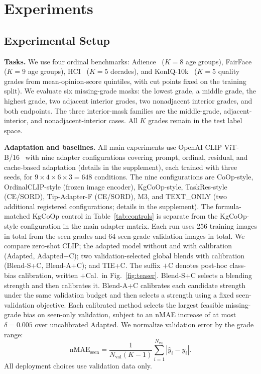 \section{Experiments}
\label{sec:experiments}

\subsection{Experimental Setup}
\label{sec:exp_setup}

\noindent\textbf{Tasks.}
We use four ordinal benchmarks: Adience~\cite{eidinger2014age} ($K{=}8$ age groups), FairFace~\cite{karkkainen2021fairface} ($K{=}9$ age groups), HCI~\cite{palermo2012dating} ($K{=}5$ decades), and KonIQ-10k~\cite{hosu2020koniq} ($K{=}5$ quality grades from mean-opinion-score quintiles, with cut points fixed on the training split).
We evaluate six missing-grade masks: the lowest grade, a middle grade, the highest grade, two adjacent interior grades, two nonadjacent interior grades, and both endpoints.
The three interior-mask families are the middle-grade, adjacent-interior, and nonadjacent-interior cases.
All $K$ grades remain in the test label space.

\noindent\textbf{Adaptation and baselines.}
All main experiments use OpenAI CLIP ViT-B/16~\cite{radford2021clip} with nine adapter configurations covering prompt, ordinal, residual, and cache-based adaptation (details in the supplement), each trained with three seeds, for $9\times4\times6\times3=648$ conditions.
The nine configurations are CoOp-style, OrdinalCLIP-style (frozen image encoder), KgCoOp-style, TaskRes-style (CE/SORD), Tip-Adapter-F (CE/SORD), M3, and TEXT\_ONLY (two additional registered configurations; details in the supplement).
The formula-matched KgCoOp control in Table~\ref{tab:controls} is separate from the KgCoOp-style configuration in the main adapter matrix.
Each run uses 256 training images in total from the seen grades and 64 seen-grade validation images in total.
We compare zero-shot CLIP; the adapted model without and with calibration (Adapted, Adapted+C); two validation-selected global blends with calibration (Blend-S+C, Blend-A+C); and TIE+C.
The suffix $+$C denotes post-hoc class-bias calibration, written $+$Cal.\ in Fig.~\ref{fig:teaser}.
Blend-S+C selects a blending strength and then calibrates it.
Blend-A+C calibrates each candidate strength under the same validation budget and then selects a strength using a fixed seen-validation objective.
Each calibrated method selects the largest feasible missing-grade bias on seen-only validation, subject to an nMAE increase of at most $\delta=0.005$ over uncalibrated Adapted.
We normalize validation error by the grade range:
\[
\mathrm{nMAE}_{\mathrm{seen}}
=\frac{1}{N_{\mathrm{val}}(K-1)}
\sum_{i=1}^{N_{\mathrm{val}}}|\hat y_i-y_i|.
\]
All deployment choices use validation data only.

